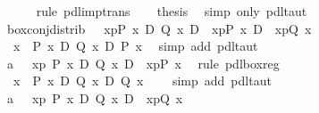 \begin{isabellebody}
\ \ \ \ \isamarkupfalse%
\ {\isacharparenleft}rule\ pdl{\isacharunderscore}imp{\isacharunderscore}trans{\isacharparenright}\isanewline
\ \ \isamarkupfalse%
\ {\isacharquery}thesis\ \isamarkupfalse%
\ {\isacharparenleft}simp\ only{\isacharcolon}\ pdl{\isacharunderscore}taut{\isacharparenright}\isanewline
\isamarkupfalse%
\isanewline
\ \ \isanewline
\isanewline
\isamarkupfalse%
\ box{\isacharunderscore}conj{\isacharunderscore}distrib{}{\isacharcolon}\ {\isachardoublequote}{\isasymturnstile}\ {\isacharbrackleft}{\isacharhash}\ x{\isasymleftarrow}p{\isacharbrackright}{\isacharparenleft}P\ x\ {\isasymand}\isactrlsub D\ Q\ x{\isacharparenright}\ {\isasymlongrightarrow}\isactrlsub D\ {\isacharbrackleft}{\isacharhash}\ x{\isasymleftarrow}p{\isacharbrackright}{\isacharparenleft}P\ x{\isacharparenright}\ {\isasymand}\isactrlsub D\ {\isacharbrackleft}{\isacharhash}\ x{\isasymleftarrow}p{\isacharbrackright}{\isacharparenleft}Q\ x{\isacharparenright}{\isachardoublequote}\isanewline
\isamarkupfalse%
\ {\isacharminus}\isanewline
\ \ \isamarkupfalse%
\ {\isachardoublequote}\ {\isasymforall}x{\isachardot}\ {\isasymturnstile}\ P\ x\ {\isasymand}\isactrlsub D\ Q\ x\ {\isasymlongrightarrow}\isactrlsub D\ P\ x{\isachardoublequote}\ \isamarkupfalse%
\ {\isacharparenleft}simp\ add{\isacharcolon}\ pdl{\isacharunderscore}taut{\isacharparenright}\isanewline
\ \ \isamarkupfalse%
\ a{}{\isacharcolon}\ {\isachardoublequote}{\isasymturnstile}\ {\isacharbrackleft}{\isacharhash}\ x{\isasymleftarrow}p{\isacharbrackright}\ {\isacharparenleft}P\ x\ {\isasymand}\isactrlsub D\ Q\ x{\isacharparenright}\ {\isasymlongrightarrow}\isactrlsub D\ {\isacharbrackleft}{\isacharhash}\ x{\isasymleftarrow}p{\isacharbrackright}{\isacharparenleft}P\ x{\isacharparenright}{\isachardoublequote}\ \isamarkupfalse%
\ {\isacharparenleft}rule\ pdl{\isacharunderscore}box{\isacharunderscore}reg{\isacharparenright}\isanewline
\ \ \isamarkupfalse%
\ {\isachardoublequote}\ {\isasymforall}x{\isachardot}\ {\isasymturnstile}\ P\ x\ {\isasymand}\isactrlsub D\ Q\ x\ {\isasymlongrightarrow}\isactrlsub D\ Q\ x{\isachardoublequote}\ \ \ \isamarkupfalse%
\ {\isacharparenleft}simp\ add{\isacharcolon}\ pdl{\isacharunderscore}taut{\isacharparenright}\isanewline
\ \ \isamarkupfalse%
\ a{}{\isacharcolon}\ {\isachardoublequote}{\isasymturnstile}\ {\isacharbrackleft}{\isacharhash}\ x{\isasymleftarrow}p{\isacharbrackright}\ {\isacharparenleft}P\ x\ {\isasymand}\isactrlsub D\ Q\ x{\isacharparenright}\ {\isasymlongrightarrow}\isactrlsub D\ {\isacharbrackleft}{\isacharhash}\ x{\isasymleftarrow}p{\isacharbrackright}{\isacharparenleft}Q\ x{\isacharparenright}{\isachardoublequote}\ \isamarkupfalse%

\end{isabellebody}
